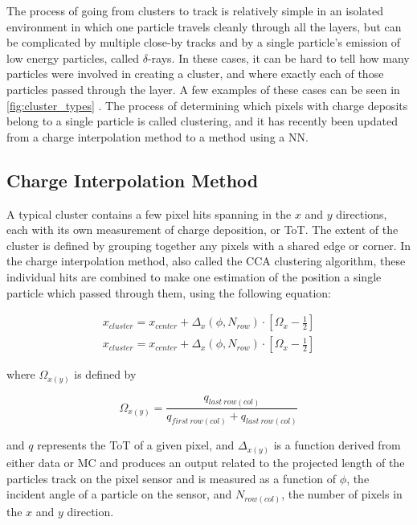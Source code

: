 The process of going from clusters to track is relatively simple in an isolated environment in which one particle travels cleanly through all the layers, but can be complicated by multiple close-by tracks and by a single particle's emission of low energy particles, called $\delta$-rays. In these cases, it can be hard to tell how many particles were involved in creating a cluster, and where exactly each of those particles passed through the layer. A few examples of these cases can be seen in \autoref{fig:cluster_types} . The process of determining which pixels with charge deposits belong to a single particle is called clustering, and it has recently been updated from a charge interpolation method to a method using a \ac{NN}. 

\subsection{Charge Interpolation Method}

A typical cluster contains a few pixel hits spanning in the $x$ and $y$ directions, each with its own measurement of charge deposition, or \ac{ToT}. The extent of the cluster is defined by grouping together any pixels with a shared edge or corner. In the charge interpolation method, also called the \ac{CCA} clustering algorithm, these individual hits are combined to make one estimation of the position a single particle which passed through them, using the following equation: 

\begin{eqnarray}
x_{cluster} = x_{center} + \Delta_x(\phi,N_{row}) \cdot \left[ \Omega_x -\frac{1}{2} \right] \\
\label{eq:analogx}
x_{cluster} = x_{center} + \Delta_x(\phi,N_{row}) \cdot \left[ \Omega_x -\frac{1}{2} \right]
\label{eq:analogy}
\end{eqnarray}

where $\Omega_{x(y)}$ is defined by

\begin{equation}
\Omega_{x(y)} = \frac{q_{last~row(col)}}{q_{first~row(col)} + q_{last~row(col)}}
\end{equation}

and $q$ represents the \ac{ToT} of a given pixel, and $\Delta_{x(y)}$ is a function derived from either data or \ac{MC} and produces an output related to the projected length of the particles track on the pixel sensor and is measured as a function of $\phi$, the incident angle of a particle on the sensor, and $N_{row(col)}$, the number of pixels in the $x$ and $y$ direction. 


